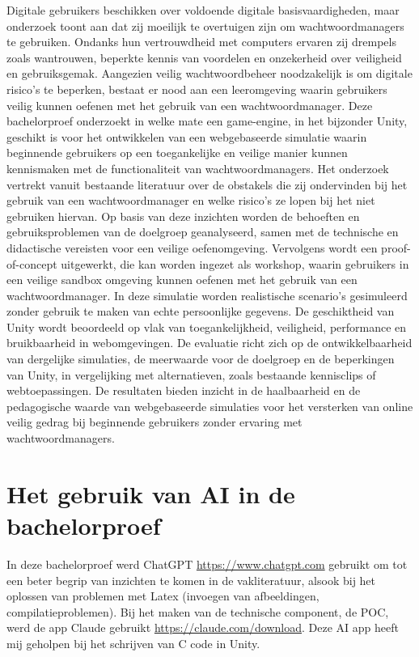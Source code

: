Digitale gebruikers beschikken over voldoende digitale basisvaardigheden, maar onderzoek toont aan dat zij moeilijk te overtuigen zijn om wachtwoordmanagers te gebruiken. Ondanks hun vertrouwdheid met computers ervaren zij drempels zoals wantrouwen, beperkte kennis van voordelen en onzekerheid over veiligheid en gebruiksgemak. Aangezien veilig wachtwoordbeheer noodzakelijk is om digitale risico’s te beperken, bestaat er nood aan een leeromgeving waarin gebruikers veilig kunnen oefenen met het gebruik van een wachtwoordmanager.
Deze bachelorproef onderzoekt in welke mate een game-engine, in het bijzonder Unity, geschikt is voor het ontwikkelen van een webgebaseerde simulatie waarin beginnende gebruikers op een toegankelijke en veilige manier kunnen kennismaken met de functionaliteit van wachtwoordmanagers. Het onderzoek vertrekt vanuit bestaande literatuur over de obstakels die zij ondervinden bij het gebruik van een wachtwoordmanager en welke risico's ze lopen bij het niet gebruiken hiervan. Op basis van deze inzichten worden de behoeften en gebruiksproblemen van de doelgroep geanalyseerd, samen met de technische en didactische vereisten voor een veilige oefenomgeving. 
Vervolgens wordt een proof-of-concept uitgewerkt, die kan worden ingezet als workshop, waarin gebruikers in een veilige sandbox omgeving kunnen oefenen met het gebruik van een wachtwoordmanager. In deze simulatie worden realistische scenario's gesimuleerd zonder gebruik te maken van echte persoonlijke gegevens. 
De geschiktheid van Unity wordt beoordeeld op vlak van toegankelijkheid, veiligheid, performance en bruikbaarheid in webomgevingen. De evaluatie richt zich op de ontwikkelbaarheid van dergelijke simulaties, de meerwaarde voor de doelgroep en de beperkingen van Unity, in vergelijking met alternatieven, zoals bestaande kennisclips of webtoepassingen. De resultaten bieden inzicht in de haalbaarheid en de pedagogische waarde van webgebaseerde simulaties voor het versterken van online veilig gedrag bij beginnende gebruikers zonder ervaring met wachtwoordmanagers.

\section{Het gebruik van AI in de bachelorproef}

In deze bachelorproef werd ChatGPT \url{https://www.chatgpt.com} gebruikt om tot een beter begrip van inzichten te komen in de vakliteratuur, alsook bij het oplossen van problemen met Latex (invoegen van afbeeldingen, compilatieproblemen).
Bij het maken van de technische component, de POC, werd de app Claude gebruikt \url{https://claude.com/download}. Deze AI app heeft mij geholpen bij het schrijven van C\+ code in Unity. 
